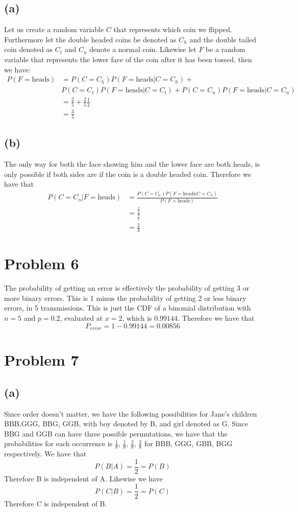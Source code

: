 \subsection*{(a)}
Let us create a random variable $C$ that represents which coin we flipped. Furthermore let the double headed coins be denoted as $C_h$ and the double tailed coin denoted as $C_t$
and $C_n$ denote a normal coin. Likewise let $F$ be a random variable that represents the lower face of the coin after it has been tossed, then we have:
\begin{align*}
    P(F=\text{heads})&=P(C=C_h)P(F=\text{heads}|C=C_h)+\\&P(C=C_t)P(F=\text{heads}|C=C_t)+P(C=C_n)P(F=\text{heads}|C=C_n)\\
    &=\frac{2}{5}+\frac{2}{5}\frac{1}{2}\\
    &=\boxed{\frac{3}{5}}
\end{align*}
\subsection*{(b)}
The only way for both the face showing him and the lower face are both heads, is only possible if both 
sides are if the coin is a double headed coin. Therefore we have that
\begin{align*}
    P(C=C_n|F=\text{heads})&=\frac{P(C=C_n)P(F=\text{heads}|C=C_n)}{P(F=\text{heads})}\\
    &=\frac{\frac{2}{5}}{\frac{3}{5}}\\
    &=\boxed{\frac{2}{3}}
\end{align*}
\section*{Problem 6}
The probability of getting an error is effectively the probability of getting 
3 or more binary errors. This is 1 minus the probability of getting 2 or less binary errors, in 5 transmissions. 
This is just the CDF of a binomial distribution with $n=5$ and $p=0.2$, evaluated at $x=2$, which is $0.99144$. Therefore we have that
$$P_{error}=1-0.99144=\boxed{0.00856}$$
\section*{Problem 7}
\subsection*{(a)}
Since order doesn't matter, we have the following possibilities for Jane's children
BBB,GGG, BBG, GGB, with boy denoted by B, and girl denoted as G. Since 
BBG and GGB can have three possible permutations, we have that the probabilities for each occurrence
is $\frac{1}{8}$, $\frac{1}{8}$, $\frac{3}{8}$, $\frac{3}{8}$ for BBB, GGG, GBB, BGG respectively. 
We have that
$$P(B|A)=\frac{1}{2}=P(B)$$
Therefore B is independent of A. Likewise we have
$$P(C|B)=\frac{1}{2}=P(C)$$
Therefore C is independent of B.
